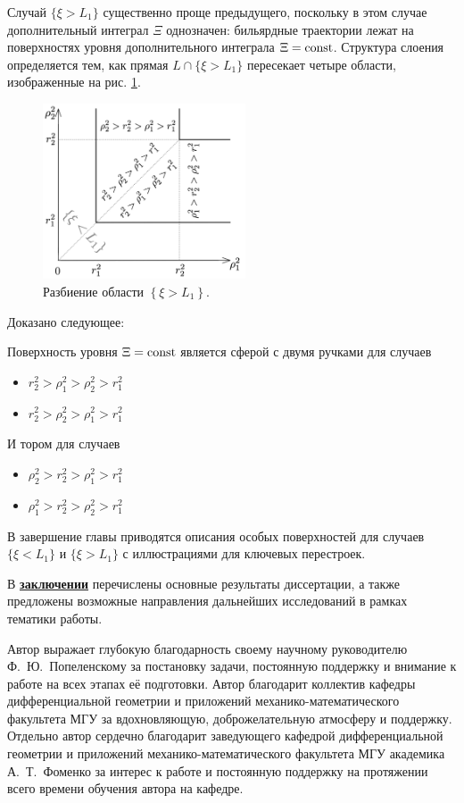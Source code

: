 Случай $\{\xi > L_1\}$ существенно проще предыдущего, поскольку в этом случае дополнительный интеграл $\Xi$ однозначен: бильярдные траектории лежат на поверхностях уровня дополнительного интеграла $\Xi=\mathrm{const}$.
Структура слоения определяется тем, как прямая $L \cap  \{\xi > L_1\}$ пересекает четыре области, изображенные на рис. \ref{fig:pt10:_xiL1_subdivision}.
\begin{figure}[!htb]
\centering
\includegraphics[width=6cm]{images/ch4/section3_circular/sect3_xiL1_subdivision.pdf}
    \caption{Разбиение области $\left\{\xi > L_1\right\}$.}
    \label{fig:pt10:_xiL1_subdivision}
\end{figure}
Доказано следующее:
\begin{theorem}
Поверхность уровня $\Xi = \mathrm{const}$ является сферой с двумя ручками для случаев
\begin{itemize}[beginpenalty=10000]
\item $r_2^2 > \rho_1^2 > \rho_2^2 > r_1^2$
\item $r_2^2 > \rho_2^2 > \rho_1^2 > r_1^2$
\end{itemize}
И тором для случаев 
\begin{itemize}[beginpenalty=10000]
\item $\rho_2^2 > r_2^2 > \rho_1^2 > r_1^2$
\item $\rho_1^2 > r_2^2 > \rho_2^2 > r_1^2$
\end{itemize}
\end{theorem}

В завершение главы приводятся описания особых поверхностей для случаев $\{\xi < L_1\}$ и $\{\xi > L_1\}$ с иллюстрациями для ключевых перестроек.

\FloatBarrier
{}                                  %
В \underline{\textbf{заключении}} перечислены основные результаты диссертации, а также предложены
возможные направления дальнейших исследований в рамках тематики работы.

{\gratitude}
Автор выражает глубокую благодарность своему научному руководителю Ф.~Ю.~Попеленскому за постановку задачи, постоянную поддержку и внимание к работе на всех этапах её подготовки. 
Автор благодарит коллектив кафедры дифференциальной геометрии и приложений механико-математического факультета МГУ за вдохновляющую, доброжелательную атмосферу и поддержку.
Отдельно автор сердечно благодарит заведующего кафедрой дифференциальной геометрии и приложений механико-математического факультета МГУ академика А.~Т.~Фоменко за интерес к работе и постоянную поддержку на протяжении всего времени  обучения автора на кафедре.


